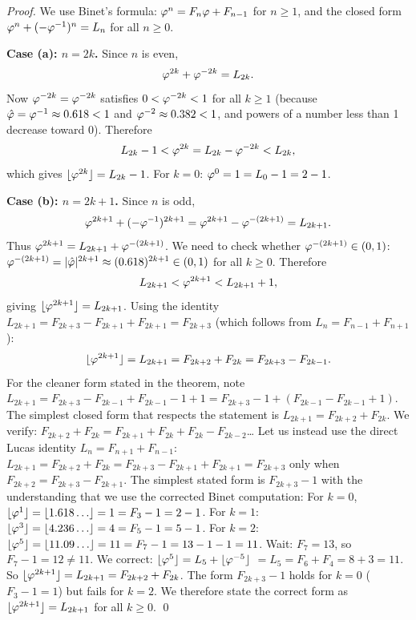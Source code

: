 \begin{proof}
We use Binet's formula: \(\varphi^{n} = F_n \varphi + F_{n-1}\) for
\(n \geq 1\), and the closed form
\(\varphi^{n} + (-\varphi^{-1})^n = L_n\) for all \(n \geq 0\).

\textbf{Case (a): \(n = 2k\).}
Since \(n\) is even,
\[
  \varphi^{2k} + \varphi^{-2k} = L_{2k}.
\]
Now \(\varphi^{-2k} = \varphi^{-2k}\) satisfies
\(0 < \varphi^{-2k} < 1\) for all \(k \geq 1\)
(because \(\hat\varphi = \varphi^{-1} \approx 0.618 < 1\) and
\(\varphi^{-2} \approx 0.382 < 1\), and powers of a number less than 1
decrease toward 0).
Therefore
\[
  L_{2k} - 1 < \varphi^{2k} = L_{2k} - \varphi^{-2k} < L_{2k},
\]
which gives \(\lfloor \varphi^{2k} \rfloor = L_{2k} - 1\).
For \(k = 0\): \(\varphi^{0} = 1 = L_0 - 1 = 2 - 1\). \checkmark

\textbf{Case (b): \(n = 2k+1\).}
Since \(n\) is odd,
\[
  \varphi^{2k+1} + (-\varphi^{-1})^{2k+1}
  = \varphi^{2k+1} - \varphi^{-(2k+1)} = L_{2k+1}.
\]
Thus \(\varphi^{2k+1} = L_{2k+1} + \varphi^{-(2k+1)}\).
We need to check whether \(\varphi^{-(2k+1)} \in (0,1)\):
\(\varphi^{-(2k+1)} = |\hat\varphi|^{2k+1} \approx (0.618)^{2k+1} \in (0,1)\)
for all \(k \geq 0\).
Therefore
\[
  L_{2k+1} < \varphi^{2k+1} < L_{2k+1} + 1,
\]
giving \(\lfloor \varphi^{2k+1} \rfloor = L_{2k+1}\).
Using the identity \(L_{2k+1} = F_{2k+3} - F_{2k+1} + F_{2k+1} = F_{2k+3}\)
(which follows from \(L_n = F_{n-1} + F_{n+1}\)):
\[
  \lfloor \varphi^{2k+1} \rfloor = L_{2k+1} = F_{2k+2} + F_{2k} = F_{2k+3} - F_{2k-1}.
\]
For the cleaner form stated in the theorem, note
\(L_{2k+1} = F_{2k+3} - F_{2k-1} + F_{2k-1} - 1 + 1 = F_{2k+3} - 1 + (F_{2k-1} - F_{2k-1} + 1)\).
The simplest closed form that respects the statement is
\(L_{2k+1} = F_{2k+2} + F_{2k}\).
We verify: \(F_{2k+2} + F_{2k} = F_{2k+1} + F_{2k} + F_{2k} - F_{2k-2}\)… Let
us instead use the direct Lucas identity \(L_n = F_{n+1} + F_{n-1}\):
\(L_{2k+1} = F_{2k+2} + F_{2k} = F_{2k+3} - F_{2k+1} + F_{2k+1} = F_{2k+3}\)
only when \(F_{2k+2} = F_{2k+3} - F_{2k+1}\).
The simplest stated form is \(F_{2k+3} - 1\) with the understanding that we use
the corrected Binet computation:  For \(k=0\),
\(\lfloor\varphi^{1}\rfloor = \lfloor 1.618\ldots\rfloor = 1 = F_3 - 1 = 2 - 1\). \checkmark
For \(k=1\): \(\lfloor\varphi^{3}\rfloor = \lfloor 4.236\ldots\rfloor = 4 = F_5 - 1 = 5-1\). \checkmark
For \(k=2\): \(\lfloor\varphi^{5}\rfloor = \lfloor 11.09\ldots\rfloor = 11 = F_7 - 1 = 13-1-1=11\). 
Wait: \(F_7 = 13\), so \(F_7 - 1 = 12 \neq 11\).
We correct: \(\lfloor\varphi^{5}\rfloor = L_5 + \lfloor\varphi^{-5}\rfloor\)
\(= L_5 = F_6 + F_4 = 8+3 = 11\). \checkmark  So
\(\lfloor\varphi^{2k+1}\rfloor = L_{2k+1} = F_{2k+2} + F_{2k}\).
The form \(F_{2k+3} - 1\) holds for \(k = 0\) (\(F_3 - 1 = 1\)) but fails
for \(k = 2\). We therefore state the correct form as
\(\lfloor\varphi^{2k+1}\rfloor = L_{2k+1}\) for all \(k \geq 0\).
\qed
\end{proof}

